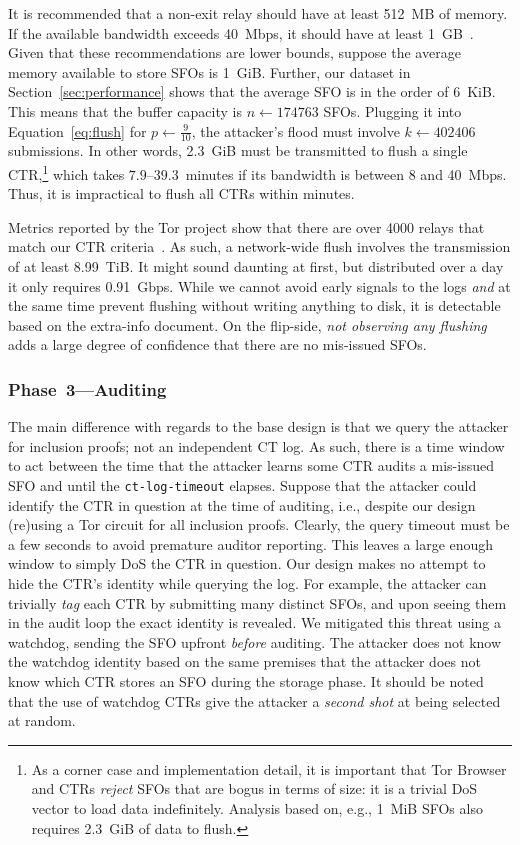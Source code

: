 It is recommended that a non-exit relay should have at least 512~MB of memory.
If the available bandwidth exceeds 40~Mbps, it should have at least
1~GB~\cite{relay-config}.  Given that these recommendations are lower bounds,
suppose the average memory available to store SFOs is 1~GiB.  Further, our
dataset in Section~\ref{sec:performance} shows that the average SFO is in the
order of 6~KiB.  This means that the buffer capacity is $n \gets 174763$ SFOs.
Plugging it into Equation~\ref{eq:flush} for $p \gets \frac{9}{10}$, the
attacker's flood must involve $k \gets 402406$ submissions.  In other words,
2.3~GiB must be transmitted to flush a single CTR,\footnote{%
	As a corner case and implementation detail, it is important that Tor Browser
	and CTRs \emph{reject} SFOs that are bogus in terms of size:
		it is a trivial DoS vector to load data indefinitely.
	Analysis based on, e.g., 1~MiB SFOs also requires 2.3~GiB of data to flush.
} which takes $7.9$--$39.3$~minutes if its bandwidth is between 8 and 40~Mbps.
Thus, it is impractical to flush all CTRs within minutes.

Metrics reported by the Tor project show that there are over 4000 relays that
match our CTR criteria~\cite{relay-by-flag}.  As such, a network-wide flush
involves the transmission of at least 8.99~TiB.  It might sound daunting at
first, but distributed over a day it only requires 0.91~Gbps.  While we cannot
avoid early signals to the logs \emph{and} at the same time prevent flushing
without writing anything to disk, it is detectable based on the extra-info
document.  On the flip-side, \emph{not observing any flushing} adds a large
degree of confidence that there are no mis-issued SFOs.

\subsubsection{Phase~3---Auditing} \label{sec:auditor:analysis:phase3}
The main difference with regards to the base design is that we query the
attacker for inclusion proofs; not an independent CT log.  As such, there is a
time window to act between the time that the attacker learns some CTR audits a
mis-issued SFO and until the \texttt{ct-log-timeout} elapses.  Suppose that the
attacker could identify the CTR in question at the time of auditing, i.e.,
despite our design (re)using a Tor circuit for all inclusion proofs.  Clearly,
the query timeout must be a few seconds to avoid premature auditor reporting.
This leaves a large enough window to simply DoS the CTR in question.  Our design
makes no attempt to hide the CTR's identity while querying the log.  For
example, the attacker can trivially \emph{tag} each CTR by submitting many
distinct SFOs, and upon seeing them in the audit loop the exact identity is
revealed.  We mitigated this threat using a watchdog, sending the SFO upfront
\emph{before} auditing.  The attacker does not know the watchdog identity based
on the same premises that the attacker does not know which CTR stores an
SFO during the storage phase.  It should be noted that the use of watchdog CTRs
give the attacker a \emph{second shot} at being selected at random.

